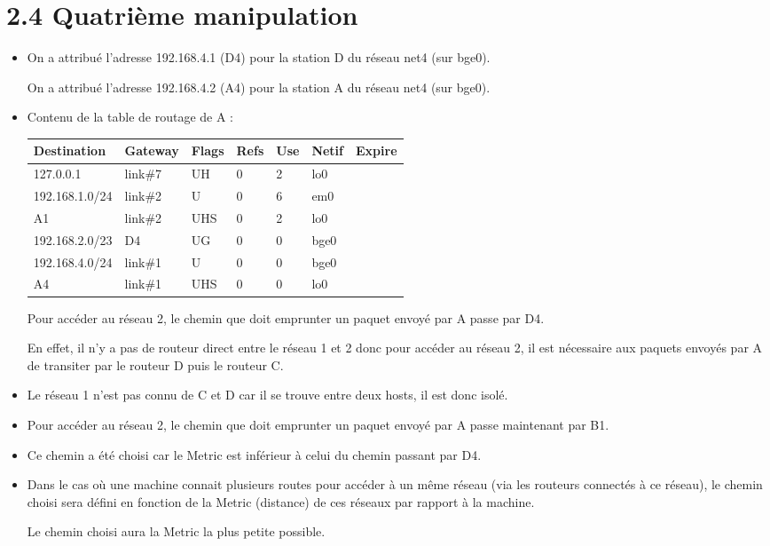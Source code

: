 \documentclass{article}
\begin{document}
\section*{2.4 Quatrième manipulation}

\begin{itemize}\renewcommand{\labelitemi}{$\bullet$}
\item On a attribué l'adresse 192.168.4.1 (D4) pour la station D du réseau net4 (sur bge0).

On a attribué l'adresse 192.168.4.2 (A4) pour la station A du réseau net4 (sur bge0).
\item Contenu de la table de routage de A :

\begin{tabular}{|p{2cm}|p{2cm}|p{1cm}|p{1cm}|p{1cm}|p{2cm}|p{2cm}|}
\hline
Destination & Gateway & Flags & Refs & Use & Netif & Expire\\
\hline
127.0.0.1 & link\#7 & UH & 0 & 2 & lo0 & \\ 
\hline
192.168.1.0/24 & link\#2 & U & 0 & 6 & em0 & \\ 
\hline
A1 & link\#2 & UHS & 0 & 2 & lo0 & \\ 
\hline
192.168.2.0/23 & D4 & UG & 0 & 0 & bge0 & \\ 
\hline
192.168.4.0/24 & link\#1 & U & 0 & 0 & bge0 & \\ 
\hline
A4 & link\#1 & UHS & 0 & 0 & lo0 & \\ 
\hline
\end{tabular}

Pour accéder au réseau 2, le chemin que doit emprunter un paquet envoyé par A passe par D4.

En effet, il n'y a pas de routeur direct entre le réseau 1 et 2 donc pour accéder au réseau 2, il est nécessaire aux paquets envoyés par A de transiter par le routeur D puis le routeur C.

\item Le réseau 1 n'est pas connu de C et D car il se trouve entre deux hosts, il est donc isolé.

\item Pour accéder au réseau 2, le chemin que doit emprunter un paquet envoyé par A passe maintenant par B1.

\item Ce chemin a été choisi car le Metric est inférieur à celui du chemin passant par D4.

\item Dans le cas où une machine connait plusieurs routes pour accéder à un même réseau (via les routeurs connectés à ce réseau), le chemin choisi sera défini en fonction de la Metric (distance) de ces réseaux par rapport à la machine.

Le chemin choisi aura la Metric la plus petite possible. 
\end{itemize}
\end{document}
